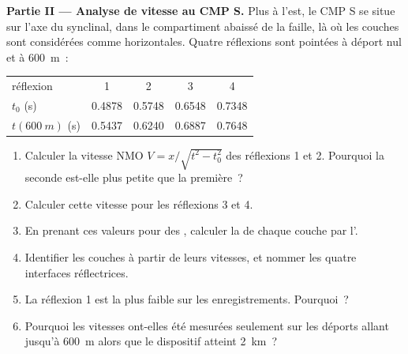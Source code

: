 \begin{problem}
\noindent\textbf{Partie II --- Analyse de vitesse au CMP S.} Plus à l'est, le CMP S
se situe sur l'axe du synclinal, dans le compartiment abaissé de la faille, là où
les couches sont considérées comme horizontales. Quatre réflexions sont pointées à déport nul et à
\qty{600}{m}~:
\begin{center}
\small
\begin{tabular}{lcccc}
\hline
réflexion & 1 & 2 & 3 & 4 \\
$t_0$ (\unit{s}) & 0.4878 & 0.5748 & 0.6548 & 0.7348 \\
$t(\qty{600}{m})$ (\unit{s}) & 0.5437 & 0.6240 & 0.6887 & 0.7648 \\
\hline
\end{tabular}
\end{center}
\begin{enumerate}[resume]
  \item Calculer la vitesse NMO $V = x/\sqrt{t^2 - t_0^2}$ des réflexions 1
        et 2. Pourquoi la seconde est-elle plus petite que la première~?
  \item Calculer cette vitesse pour les réflexions 3 et 4.
  \item En prenant ces valeurs pour des , calculer la  de chaque
        couche par l'.
  \item Identifier les couches à partir de leurs vitesses, et nommer les quatre
        interfaces réflectrices.
  \item La réflexion 1 est la plus faible sur les enregistrements. Pourquoi~?
  \item Pourquoi les vitesses ont-elles été mesurées seulement sur les déports allant jusqu'à \qty{600}{m}
        alors que le dispositif atteint \qty{2}{km}~?
\end{enumerate}


\end{problem}
